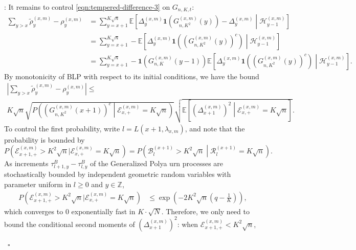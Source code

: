 \documentclass[twoside,12pt,a4paper]{article}
\numberwithin{equation}{section}
\newenvironment{proof}[1][Proof]{{\sc #1}:}{~\hfill $\square$}
\begin{document}
\begin{proof}[Proof of Proposition~\ref{lm: approx local drift by conditional means}]
It remains to control  \eqref{eqn:tempered-difference-3} on $G_{n, K, t}$:
	\begin{align*}
		\sum_{y > x} \tilde\rho_y^{(x,m)} - \rho_y^{(x,m)}
		&= \sum_{y = x + 1}^{K \sqrt{n} } \mathbb{E}\left[ \Delta_y^{(x,m)}\mathbf{1}\left( G_{n, K^2}^{(x,m)}(y) \right) - \Delta_{y}^{(x,m)} \middle| \mathcal{H}_{y-1}^{(x,m)}  \right]  \\
		&= \sum_{y = x + 1}^{K \sqrt{n} } -\mathbb{E}\left[ \Delta_y^{(x,m)}\mathbf{1}\left( \left( G_{n, K^2}^{(x,m)}(y) \right) ^c \right) \middle| \mathcal{H}_{y-1}^{(x,m)}  \right]  \\
		&= \sum_{y = x + 1}^{K \sqrt{n} } -\mathbf{1}\left(G_{n, K}^{(x,m)}(y-1)\right) \mathbb{E}\left[ \Delta_y^{(x,m)}\mathbf{1}\left( \left( G_{n, K^2}^{(x,m)}(y) \right) ^c \right) \middle| \mathcal{H}_{y-1}^{(x,m)}  \right] 
	.\end{align*}
By monotonicity of BLP with respect to its initial conditions, we have the bound
\begin{multline*}
	\left| \sum_{y > x} \tilde\rho_y^{(x,m)} - \rho_y^{(x,m)} \right| \le \\
	K \sqrt{n} 
	\sqrt{ P\left( \left( G^{(x,m)}_{n, K^2}(x+1) \right) ^{c} \middle| \mathcal{E}_{x,+}^{(x,m)} = K \sqrt{n}  \right) }
	\sqrt{ \mathbb{E}\left[ \left(\Delta_{x+1}^{(x,m)}\right)^2 \middle| \mathcal{E}_{x,+}^{(x,m)} = K \sqrt{n}  \right]}
.\end{multline*}
To control the first probability, write $l = L\left( x+1, \lambda_{x, m} \right) $, and note that the probability is bounded by 
\[
	P\left(\mathcal{E}_{x+1,+}^{(x,m)} > K^2 \sqrt{n} | \mathcal{E}_{x,+}^{(x, m)} = K \sqrt{n}\right)
	= P\left(\mathcal{B}^{(x+1)}_{l} > K^2 \sqrt{n} \middle| \mathcal{R}^{(x + 1)}_l = K \sqrt{n}  \right)
.\] 
As increments $\tau^B_{l+1,y} -\tau^B_{l,y}$ of the Generalized Polya urn processes are stochastically bounded by independent geometric random variables with parameter uniform in $l\geq 0$ and $y \in \mathbb{Z}$, 
\begin{align*}
	P(\mathcal{E}_{x+1,+}^{(x,m)} > K^2 \sqrt{n} | \mathcal{E}_{x,+}^{(x, m)} = K \sqrt{n})
	&\le \exp\left( - 2 K^2 \sqrt{n}(q - \frac{1}{K})  \right) 
,
\end{align*}
which converges to $0$ exponentially fast in $K \cdot \sqrt{N}$. Therefore, we only need to bound the conditional second moments of $\left( \Delta_{x+1}^{(x,m)} \right) ^2$: when $\mathcal{E}_{x+1,+}^{(x,m)} < K^2 \sqrt{n} $, 

\end{proof}
\end{document}
